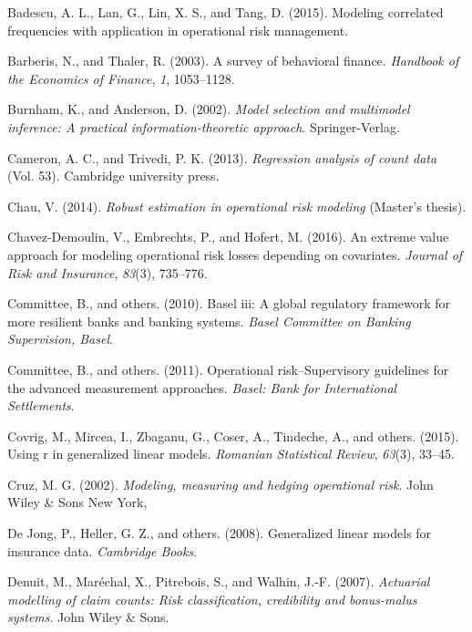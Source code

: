 \documentclass[]{DissertateUSU}
\begin{document}
\hypertarget{ref-badescu2015modeling}{}
Badescu, A. L., Lan, G., Lin, X. S., and Tang, D. (2015). Modeling
correlated frequencies with application in operational risk management.

\hypertarget{ref-barberis2003survey}{}
Barberis, N., and Thaler, R. (2003). A survey of behavioral finance.
\emph{Handbook of the Economics of Finance}, \emph{1}, 1053--1128.

\hypertarget{ref-Burnham2002}{}
Burnham, K., and Anderson, D. (2002). \emph{Model selection and
multimodel inference: A practical information-theoretic approach}.
Springer-Verlag.

\hypertarget{ref-cameron2013regression}{}
Cameron, A. C., and Trivedi, P. K. (2013). \emph{Regression analysis of
count data} (Vol. 53). Cambridge university press.

\hypertarget{ref-chau2014robust}{}
Chau, V. (2014). \emph{Robust estimation in operational risk modeling}
(Master's thesis).

\hypertarget{ref-chavez2016extreme}{}
Chavez-Demoulin, V., Embrechts, P., and Hofert, M. (2016). An extreme
value approach for modeling operational risk losses depending on
covariates. \emph{Journal of Risk and Insurance}, \emph{83}(3),
735--776.

\hypertarget{ref-basel2010basel}{}
Committee, B., and others. (2010). Basel iii: A global regulatory
framework for more resilient banks and banking systems. \emph{Basel
Committee on Banking Supervision, Basel}.

\hypertarget{ref-basel2011operational}{}
Committee, B., and others. (2011). Operational risk--Supervisory
guidelines for the advanced measurement approaches. \emph{Basel: Bank
for International Settlements}.

\hypertarget{ref-covrig2015using}{}
Covrig, M., Mircea, I., Zbaganu, G., Coser, A., Tindeche, A., and
others. (2015). Using r in generalized linear models. \emph{Romanian
Statistical Review}, \emph{63}(3), 33--45.

\hypertarget{ref-cruz2002modeling}{}
Cruz, M. G. (2002). \emph{Modeling, measuring and hedging operational
risk}. John Wiley \& Sons New York,

\hypertarget{ref-de2008generalized}{}
De Jong, P., Heller, G. Z., and others. (2008). Generalized linear
models for insurance data. \emph{Cambridge Books}.

\hypertarget{ref-denuit2007actuarial}{}
Denuit, M., Maréchal, X., Pitrebois, S., and Walhin, J.-F. (2007).
\emph{Actuarial modelling of claim counts: Risk classification,
credibility and bonus-malus systems}. John Wiley \& Sons.
\end{document}
